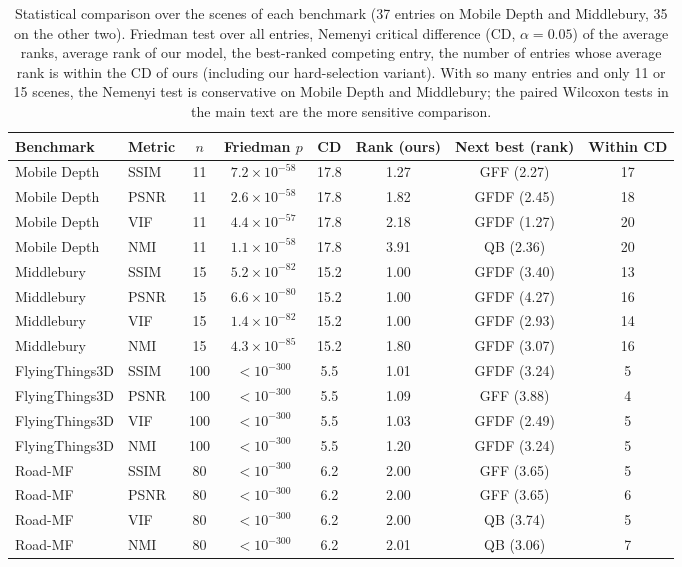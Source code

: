 \begin{table}[htbp]
\centering
\scriptsize
\setlength{\tabcolsep}{3pt}
\caption{Statistical comparison over the scenes of each benchmark (37 entries on Mobile Depth and Middlebury, 35 on the other two). Friedman test over all entries, Nemenyi critical difference (CD, $\alpha=0.05$) of the average ranks, average rank of our model, the best-ranked competing entry, the number of entries whose average rank is within the CD of ours (including our hard-selection variant). With so many entries and only 11 or 15 scenes, the Nemenyi test is conservative on Mobile Depth and Middlebury; the paired Wilcoxon tests in the main text are the more sensitive comparison.}
\label{tab:stats}
\begin{tabular}{llcccccc}
\toprule
Benchmark & Metric & $n$ & Friedman $p$ & CD & Rank (ours) & Next best (rank) & Within CD \\
\midrule
Mobile Depth & SSIM & 11 & $7.2\times10^{-58}$ & 17.8 & 1.27 & GFF (2.27) & 17 \\
Mobile Depth & PSNR & 11 & $2.6\times10^{-58}$ & 17.8 & 1.82 & GFDF (2.45) & 18 \\
Mobile Depth & VIF & 11 & $4.4\times10^{-57}$ & 17.8 & 2.18 & GFDF (1.27) & 20 \\
Mobile Depth & NMI & 11 & $1.1\times10^{-58}$ & 17.8 & 3.91 & QB (2.36) & 20 \\
Middlebury & SSIM & 15 & $5.2\times10^{-82}$ & 15.2 & 1.00 & GFDF (3.40) & 13 \\
Middlebury & PSNR & 15 & $6.6\times10^{-80}$ & 15.2 & 1.00 & GFDF (4.27) & 16 \\
Middlebury & VIF & 15 & $1.4\times10^{-82}$ & 15.2 & 1.00 & GFDF (2.93) & 14 \\
Middlebury & NMI & 15 & $4.3\times10^{-85}$ & 15.2 & 1.80 & GFDF (3.07) & 16 \\
FlyingThings3D & SSIM & 100 & $<10^{-300}$ & 5.5 & 1.01 & GFDF (3.24) & 5 \\
FlyingThings3D & PSNR & 100 & $<10^{-300}$ & 5.5 & 1.09 & GFF (3.88) & 4 \\
FlyingThings3D & VIF & 100 & $<10^{-300}$ & 5.5 & 1.03 & GFDF (2.49) & 5 \\
FlyingThings3D & NMI & 100 & $<10^{-300}$ & 5.5 & 1.20 & GFDF (3.24) & 5 \\
Road-MF & SSIM & 80 & $<10^{-300}$ & 6.2 & 2.00 & GFF (3.65) & 5 \\
Road-MF & PSNR & 80 & $<10^{-300}$ & 6.2 & 2.00 & GFF (3.65) & 6 \\
Road-MF & VIF & 80 & $<10^{-300}$ & 6.2 & 2.00 & QB (3.74) & 5 \\
Road-MF & NMI & 80 & $<10^{-300}$ & 6.2 & 2.01 & QB (3.06) & 7 \\
\bottomrule
\end{tabular}
\end{table}
